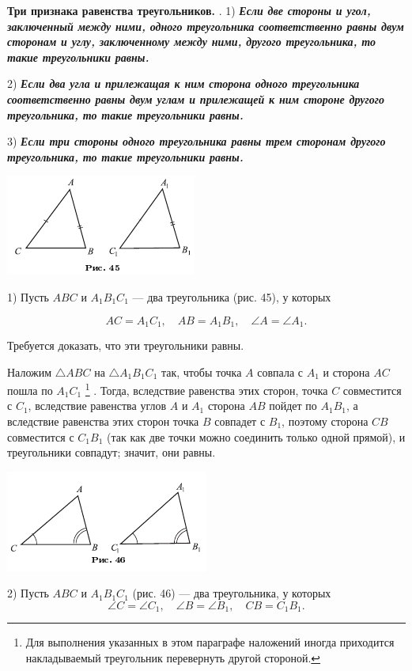 \documentclass[oneside]{book}
\begin{document}
\textbf{Три признака равенства треугольников.}
.
1) \textbf{\emph{Если две стороны и угол, заключенный
между ними, одного треугольника соответственно равны
двум сторонам и углу, заключенному между ними, другого треугольника, то такие треугольники равны.}}

2) \textbf{\emph{Если два угла и прилежащая к ним сторона одного треугольника соответственно равны двум углам и прилежащей к ним стороне другого треугольника, то такие треугольники равны.}}

3) \textbf{\emph{Если три стороны одного треугольника равны трем сторонам другого треугольника, то такие треугольники равны.}}

\includegraphics{pics/ris-45}

1) Пусть $ABC$ и $A_1B_1C_1$ — два треугольника (рис. 45), у которых

\[AC=A_1C_1,\quad AB = A_1B_1,\quad \angle A = \angle A_1.\]

Требуется доказать, что эти треугольники равны.

Наложим $\triangle ABC$ на $\triangle A_1B_1C_1$ так, чтобы точка $A$ совпала с $A_1$ и сторона $AC$ пошла по $A_1C_1$%
\footnote{Для выполнения указанных в этом параграфе наложений иногда приходится накладываемый треугольник перевернуть другой стороной.}%
.
Тогда, вследствие равенства этих сторон, точка $C$ совместится с $C_1$, вследствие равенства углов $A$ и $A_1$ сторона $AB$ пойдет по $A_1B_1$, а вследствие равенства этих сторон точка $B$ совпадет с $B_1$, поэтому сторона $CB$ совместится с $C_1B_1$ (так как две точки можно соединить только одной прямой), и треугольники совпадут;
значит, они равны.

\includegraphics{pics/ris-46}

2) Пусть $ABC$ и $A_1B_1C_1$ (рис. 46) — два треугольника, у которых
\[\angle C= \angle C_1,
\quad
\angle B=\angle B_1,
\quad
CB = C_1B_1.\]
\end{document}
